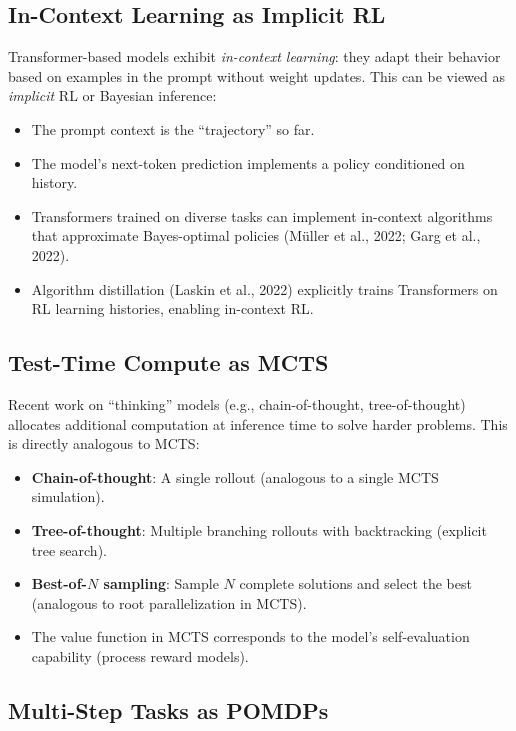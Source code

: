 \documentclass[11pt,a4paper]{article}
\begin{document}
\subsection{In-Context Learning as Implicit RL}

Transformer-based models exhibit \emph{in-context learning}: they adapt their
behavior based on examples in the prompt without weight updates. This can be
viewed as \emph{implicit} RL or Bayesian inference:

\begin{itemize}[nosep]
  \item The prompt context is the ``trajectory'' so far.
  \item The model's next-token prediction implements a policy conditioned on history.
  \item Transformers trained on diverse tasks can implement in-context
    algorithms that approximate Bayes-optimal policies (M\"uller et al., 2022;
    Garg et al., 2022).
  \item Algorithm distillation (Laskin et al., 2022) explicitly trains
    Transformers on RL learning histories, enabling in-context RL.
\end{itemize}

\subsection{Test-Time Compute as MCTS}

Recent work on ``thinking'' models (e.g., chain-of-thought, tree-of-thought)
allocates additional computation at inference time to solve harder problems.
This is directly analogous to MCTS:

\begin{itemize}[nosep]
  \item \textbf{Chain-of-thought}: A single rollout (analogous to a single MCTS simulation).
  \item \textbf{Tree-of-thought}: Multiple branching rollouts with backtracking
    (explicit tree search).
  \item \textbf{Best-of-$N$ sampling}: Sample $N$ complete solutions and select
    the best (analogous to root parallelization in MCTS).
  \item The value function in MCTS corresponds to the model's self-evaluation
    capability (process reward models).
\end{itemize}

\subsection{Multi-Step Tasks as POMDPs}
\end{document}
